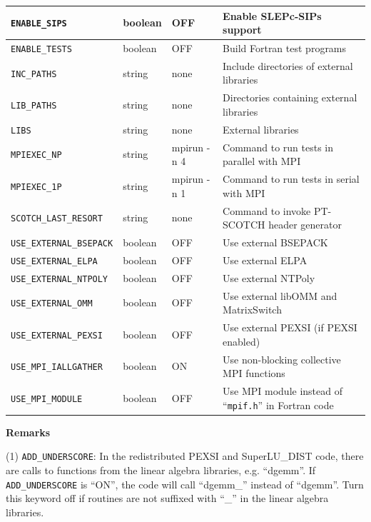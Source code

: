 \documentclass{report}
\begin{document}
\begin{longtable}[]{|p{40mm}|p{15mm}|p{20mm}|p{87mm}|}
\hline
\texttt{ENABLE\_SIPS}             & boolean & OFF         & Enable SLEPc-SIPs support\\
\hline
\texttt{ENABLE\_TESTS}            & boolean & OFF         & Build Fortran test programs\\
\hline
\texttt{INC\_PATHS}               & string  & none        & Include directories of external libraries\\
\hline
\texttt{LIB\_PATHS}               & string  & none        & Directories containing external libraries\\
\hline
\texttt{LIBS}                     & string  & none        & External libraries\\
\hline
\texttt{MPIEXEC\_NP}              & string  & mpirun -n 4 & Command to run tests in parallel with MPI\\
\hline
\texttt{MPIEXEC\_1P}              & string  & mpirun -n 1 & Command to run tests in serial with MPI\\
\hline

\texttt{SCOTCH\_LAST\_RESORT}     & string  & none        & Command to invoke PT-SCOTCH header generator\\
\hline
\texttt{USE\_EXTERNAL\_BSEPACK}   & boolean & OFF         & Use external BSEPACK\\
\hline
\texttt{USE\_EXTERNAL\_ELPA}      & boolean & OFF         & Use external ELPA\\
\hline
\texttt{USE\_EXTERNAL\_NTPOLY}    & boolean & OFF         & Use external NTPoly\\
\hline
\texttt{USE\_EXTERNAL\_OMM}       & boolean & OFF         & Use external libOMM and MatrixSwitch\\
\hline
\texttt{USE\_EXTERNAL\_PEXSI}     & boolean & OFF         & Use external PEXSI (if PEXSI enabled)\\
\hline
\texttt{USE\_MPI\_IALLGATHER}     & boolean & ON          & Use non-blocking collective MPI functions\\
\hline
\texttt{USE\_MPI\_MODULE}         & boolean & OFF         & Use MPI module instead of ``\texttt{mpif.h}'' in Fortran code\\
\hline
\end{longtable}

\textbf{Remarks}

(1) \texttt{ADD\_UNDERSCORE}: In the redistributed PEXSI and SuperLU\_DIST code, there are calls to functions from the linear algebra libraries, e.g. ``dgemm''. If \texttt{ADD\_UNDERSCORE} is ``ON'', the code will call ``dgemm\_'' instead of ``dgemm''. Turn this keyword off if routines are not suffixed with ``\_'' in the linear algebra libraries.
\end{document}

